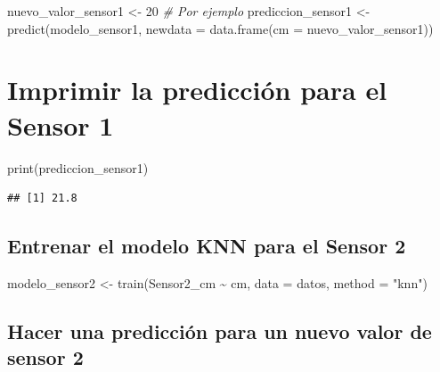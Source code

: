 \documentclass[
]{article}
\newenvironment{Shaded}{\begin{snugshade}}{\end{snugshade}}
\newcommand{\AttributeTok}[1]{\textcolor[rgb]{0.77,0.63,0.00}{#1}}
\newcommand{\CommentTok}[1]{\textcolor[rgb]{0.56,0.35,0.01}{\textit{#1}}}
\newcommand{\DecValTok}[1]{\textcolor[rgb]{0.00,0.00,0.81}{#1}}
\newcommand{\FunctionTok}[1]{\textcolor[rgb]{0.00,0.00,0.00}{#1}}
\newcommand{\NormalTok}[1]{#1}
\newcommand{\OtherTok}[1]{\textcolor[rgb]{0.56,0.35,0.01}{#1}}
\newcommand{\SpecialCharTok}[1]{\textcolor[rgb]{0.00,0.00,0.00}{#1}}
\newcommand{\StringTok}[1]{\textcolor[rgb]{0.31,0.60,0.02}{#1}}
\begin{document}
\begin{Shaded}
\begin{Highlighting}[]
\NormalTok{nuevo\_valor\_sensor1 }\OtherTok{\textless{}{-}} \DecValTok{20} \CommentTok{\# Por ejemplo}
\NormalTok{prediccion\_sensor1 }\OtherTok{\textless{}{-}} \FunctionTok{predict}\NormalTok{(modelo\_sensor1, }\AttributeTok{newdata =} \FunctionTok{data.frame}\NormalTok{(}\AttributeTok{cm =}\NormalTok{ nuevo\_valor\_sensor1))}
\end{Highlighting}
\end{Shaded}

\hypertarget{imprimir-la-predicciuxf3n-para-el-sensor-1}{%
\section{Imprimir la predicción para el Sensor
1}\label{imprimir-la-predicciuxf3n-para-el-sensor-1}}

\begin{Shaded}
\begin{Highlighting}[]
\FunctionTok{print}\NormalTok{(prediccion\_sensor1)}
\end{Highlighting}
\end{Shaded}

\begin{verbatim}
## [1] 21.8
\end{verbatim}

\hypertarget{entrenar-el-modelo-knn-para-el-sensor-2}{%
\subsection{Entrenar el modelo KNN para el Sensor
2}\label{entrenar-el-modelo-knn-para-el-sensor-2}}

\begin{Shaded}
\begin{Highlighting}[]
\NormalTok{modelo\_sensor2 }\OtherTok{\textless{}{-}} \FunctionTok{train}\NormalTok{(Sensor2\_cm }\SpecialCharTok{\textasciitilde{}}\NormalTok{ cm, }\AttributeTok{data =}\NormalTok{ datos, }\AttributeTok{method =} \StringTok{"knn"}\NormalTok{)}
\end{Highlighting}
\end{Shaded}

\hypertarget{hacer-una-predicciuxf3n-para-un-nuevo-valor-de-sensor-2}{%
\subsection{Hacer una predicción para un nuevo valor de sensor
2}\label{hacer-una-predicciuxf3n-para-un-nuevo-valor-de-sensor-2}}
\end{document}
